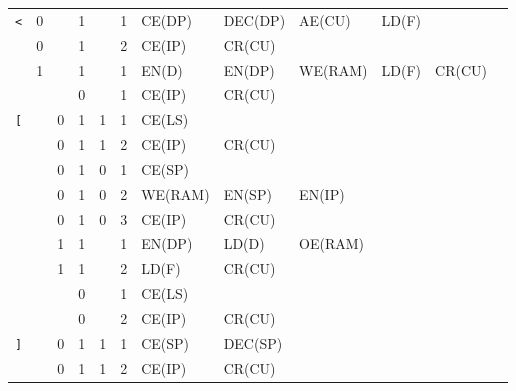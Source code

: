 \begin{longtable}[c] {c|cccc|c|llllll}
    \rowcolor{White} \texttt{<}   & 0 &   & 1     &      & 1     & CE(DP)   & DEC(DP)  & AE(CU)  & LD(F)  &        &        \\
    \rowcolor{White}              & 0 &   & 1     &      & 2     & CE(IP)   & CR(CU)   &         &        &        &        \\
    \rowcolor{Gray}               & 1 &   & 1     &      & 1     & EN(D)    & EN(DP)   & WE(RAM) & LD(F)  & CR(CU) &        \\
    \rowcolor{White}              &   &   & 0     &      & 1     & CE(IP)   & CR(CU)   &         &        &        &        \\ \hline
    
    \rowcolor{Gray}  \texttt{[}   &   & 0 & 1     & 1    & 1     & CE(LS)   &          &         &        &        &        \\
    \rowcolor{Gray}               &   & 0 & 1     & 1    & 2     & CE(IP)   & CR(CU)   &         &        &        &        \\      
    \rowcolor{White}              &   & 0 & 1     & 0    & 1     & CE(SP)   &          &         &        &        &        \\
    \rowcolor{White}              &   & 0 & 1     & 0    & 2     & WE(RAM)  & EN(SP)   & EN(IP)  &        &        &        \\
    \rowcolor{White}              &   & 0 & 1     & 0    & 3     & CE(IP)   & CR(CU)   &         &        &        &        \\
    \rowcolor{Gray}               &   & 1 & 1     &      & 1     & EN(DP)   & LD(D)    & OE(RAM) &        &        &        \\
    \rowcolor{Gray}               &   & 1 & 1     &      & 2     & LD(F)    & CR(CU)   &         &        &        &        \\
    \rowcolor{White}              &   &   & 0     &      & 1     & CE(LS)   &          &         &        &        &        \\
    \rowcolor{White}              &   &   & 0     &      & 2     & CE(IP)   & CR(CU)   &         &        &        &        \\ \hline
    
    \rowcolor{White} \texttt{]}   &   & 0 & 1     & 1    & 1     & CE(SP)   & DEC(SP)  &         &        &        &        \\
    \rowcolor{White}              &   & 0 & 1     & 1    & 2     & CE(IP)   & CR(CU)   &         &        &        &        \\
        

\end{longtable}
